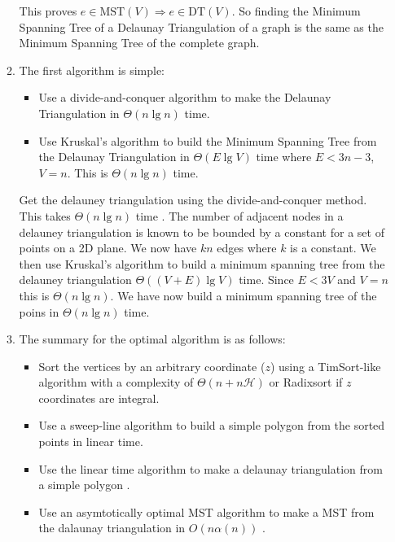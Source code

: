 \documentclass[10pt,\jkfside,a4paper]{article}
\begin{document}
\begin{enumerate}
\begin{enumerate}
This proves $e \in \text{MST}(V) \Longrightarrow e \in \text{DT}(V)$. So finding the Minimum 
Spanning Tree of a Delaunay Triangulation of a graph is the same as the Minimum Spanning 
Tree of the complete graph.

\item The first algorithm is simple:

\begin{itemize}

\item Use a divide-and-conquer algorithm to make the Delaunay Triangulation in $\Theta(n\lg n)$ time.

\item Use Kruskal's algorithm to build the Minimum Spanning Tree from the Delaunay Triangulation 
in $\Theta(E \lg V)$ time where $E < 3n - 3$, $V = n$. This is $\Theta(n \lg n)$ time.

\end{itemize}

Get the delauney triangulation using the divide-and-conquer method. This takes $\Theta(n \lg n)$ 
time \cite{nlgndelaunay}. The number of adjacent nodes in a delauney triangulation is known to be bounded by a constant for a 
set of points on a 2D plane. We now have $kn$ edges where $k$ is a constant. We then use Kruskal’s algorithm to build 
a minimum spanning tree from the delauney triangulation $\Theta((V + E) \lg V)$ time. Since $E < 3V$ and $V = n$ this is 
$\Theta(n\lg n)$. We have now build a minimum spanning tree of the poins in $\Theta(n \lg n)$ time.

\item The summary for the optimal algorithm is as follows:

\begin{itemize}

\item Sort the vertices by an arbitrary coordinate ($z$) using a TimSort-like algorithm \cite{shiverssort} with a 
complexity of $\Theta(n + n\mathcal{H})$ \cite{timsortcomplexity} or Radixsort if $z$ coordinates are integral.

\item Use a sweep-line algorithm to build a simple polygon from the sorted points in linear time.

\item Use the linear time algorithm to make a delaunay triangulation from a simple polygon \cite{lineardelaunay}.

\item Use an asymtotically optimal MST algorithm to make a MST from the dalaunay triangulation in $O(n\alpha(n))$ \cite{optimalmst}.


\end{itemize}
\end{enumerate}
\end{enumerate}
\end{document}
